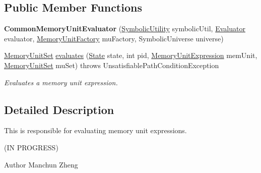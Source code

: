 \subsection*{Public Member Functions}
\begin{DoxyCompactItemize}
\item 
\hypertarget{classedu_1_1udel_1_1cis_1_1vsl_1_1civl_1_1semantics_1_1common_1_1CommonMemoryUnitEvaluator_a6fac20ed01572e519a1b0ea36b32d0a6}{}{\bfseries Common\+Memory\+Unit\+Evaluator} (\hyperlink{interfaceedu_1_1udel_1_1cis_1_1vsl_1_1civl_1_1dynamic_1_1IF_1_1SymbolicUtility}{Symbolic\+Utility} symbolic\+Util, \hyperlink{interfaceedu_1_1udel_1_1cis_1_1vsl_1_1civl_1_1semantics_1_1IF_1_1Evaluator}{Evaluator} evaluator, \hyperlink{interfaceedu_1_1udel_1_1cis_1_1vsl_1_1civl_1_1state_1_1IF_1_1MemoryUnitFactory}{Memory\+Unit\+Factory} mu\+Factory, Symbolic\+Universe universe)\label{classedu_1_1udel_1_1cis_1_1vsl_1_1civl_1_1semantics_1_1common_1_1CommonMemoryUnitEvaluator_a6fac20ed01572e519a1b0ea36b32d0a6}

\item 
\hyperlink{interfaceedu_1_1udel_1_1cis_1_1vsl_1_1civl_1_1state_1_1IF_1_1MemoryUnitSet}{Memory\+Unit\+Set} \hyperlink{classedu_1_1udel_1_1cis_1_1vsl_1_1civl_1_1semantics_1_1common_1_1CommonMemoryUnitEvaluator_a764ae459841e8b649da174ee32f906f7}{evaluates} (\hyperlink{interfaceedu_1_1udel_1_1cis_1_1vsl_1_1civl_1_1state_1_1IF_1_1State}{State} state, int pid, \hyperlink{interfaceedu_1_1udel_1_1cis_1_1vsl_1_1civl_1_1model_1_1IF_1_1expression_1_1MemoryUnitExpression}{Memory\+Unit\+Expression} mem\+Unit, \hyperlink{interfaceedu_1_1udel_1_1cis_1_1vsl_1_1civl_1_1state_1_1IF_1_1MemoryUnitSet}{Memory\+Unit\+Set} mu\+Set)  throws Unsatisfiable\+Path\+Condition\+Exception 
\begin{DoxyCompactList}\small\item\em Evaluates a memory unit expression. \end{DoxyCompactList}\end{DoxyCompactItemize}


\subsection{Detailed Description}
This is responsible for evaluating memory unit expressions. 

(I\+N P\+R\+O\+G\+R\+E\+S\+S)

\begin{DoxyAuthor}{Author}
Manchun Zheng 
\end{DoxyAuthor}



